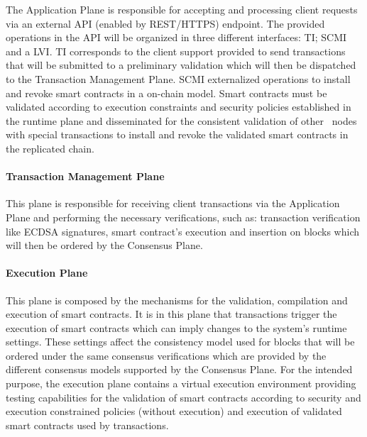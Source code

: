 The Application Plane is responsible for accepting and processing client requests via an external API (enabled by REST/HTTPS) endpoint. The provided operations in the API will be organized in three different interfaces: \gls{TI}; \gls{SCMI} and a \gls{LVI}. \gls{TI} corresponds to the client support provided to send transactions that will be submitted to a preliminary validation which will then be dispatched to the Transaction Management Plane. \gls{SCMI} externalized operations to install and revoke smart contracts in a on-chain model. Smart contracts must be validated according to execution constraints and security policies established in the runtime plane and disseminated for the consistent validation of other \mysystem~nodes with special transactions to install and revoke the validated smart contracts in the replicated chain. 

\paragraph{Transaction Management Plane}

This plane is responsible for receiving client transactions via the Application Plane and performing the necessary verifications, such as: transaction verification like ECDSA signatures, smart contract's execution and insertion on blocks which will then be ordered by the Consensus Plane.

\paragraph{Execution Plane}

This plane is composed by the mechanisms for the validation, compilation and execution of smart contracts. It is in this plane that transactions trigger the execution of smart contracts which can imply changes to the system's runtime settings. These settings affect the consistency model used for blocks that will be ordered under the same consensus verifications which are provided by the different consensus models supported by the Consensus Plane. For the intended purpose, the execution plane contains a virtual execution environment providing testing capabilities for the validation of smart contracts according to security and execution constrained policies (without execution) and execution of validated smart contracts used by transactions. %

